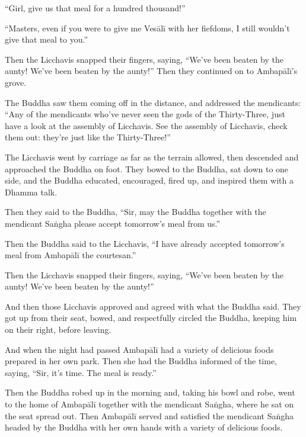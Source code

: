\documentclass[12pt,openany]{book}%
\begin{document}
“Girl, give us that meal for a hundred thousand!” 

“Masters, even if you were to give me \textsanskrit{Vesālī} with her fiefdoms, I still wouldn’t give that meal to you.” 

Then the Licchavis snapped their fingers, saying, “We’ve been beaten by the aunty! We’ve been beaten by the aunty!” Then they continued on to \textsanskrit{Ambapālī}’s grove. 

The Buddha saw them coming off in the distance, and addressed the mendicants: “Any of the mendicants who’ve never seen the gods of the Thirty-Three, just have a look at the assembly of Licchavis. See the assembly of Licchavis, check them out: they’re just like the Thirty-Three!” 

The Licchavis went by carriage as far as the terrain allowed, then descended and approached the Buddha on foot. They bowed to the Buddha, sat down to one side, and the Buddha educated, encouraged, fired up, and inspired them with a Dhamma talk. 

Then they said to the Buddha, “Sir, may the Buddha together with the mendicant \textsanskrit{Saṅgha} please accept tomorrow’s meal from us.” 

Then the Buddha said to the Licchavis, “I have already accepted tomorrow’s meal from \textsanskrit{Ambapālī} the courtesan.” 

Then the Licchavis snapped their fingers, saying, “We’ve been beaten by the aunty! We’ve been beaten by the aunty!” 

And then those Licchavis approved and agreed with what the Buddha said. They got up from their seat, bowed, and respectfully circled the Buddha, keeping him on their right, before leaving. 

And when the night had passed \textsanskrit{Ambapālī} had a variety of delicious foods prepared in her own park. Then she had the Buddha informed of the time, saying, “Sir, it’s time. The meal is ready.” 

Then the Buddha robed up in the morning and, taking his bowl and robe, went to the home of \textsanskrit{Ambapālī} together with the mendicant \textsanskrit{Saṅgha}, where he sat on the seat spread out. Then \textsanskrit{Ambapālī} served and satisfied the mendicant \textsanskrit{Saṅgha} headed by the Buddha with her own hands with a variety of delicious foods. 
\end{document}
